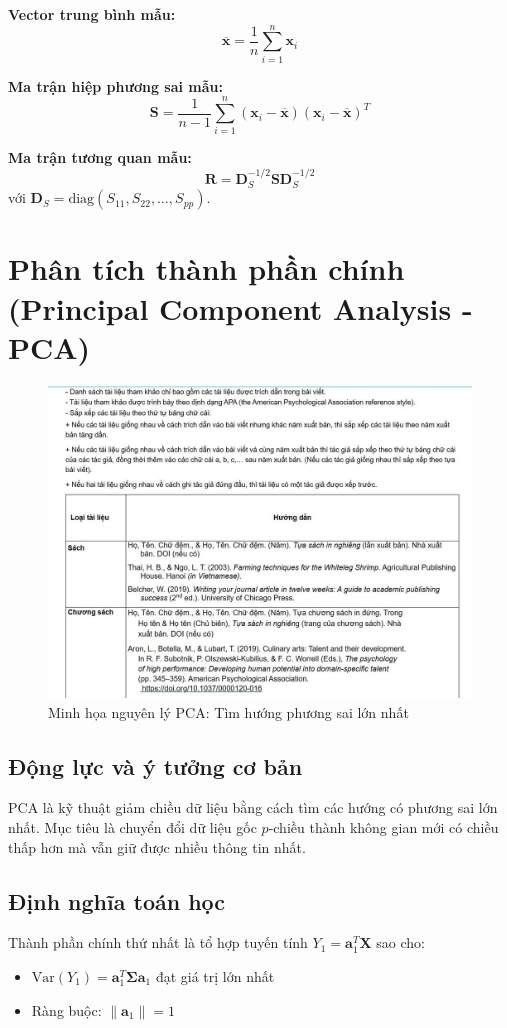 \textbf{Vector trung bình mẫu:}
\[
\overline{\mathbf{x}} = \frac{1}{n}\sum_{i=1}^n \mathbf{x}_i
\]

\textbf{Ma trận hiệp phương sai mẫu:}
\[
\mathbf{S} = \frac{1}{n-1}\sum_{i=1}^n (\mathbf{x}_i - \overline{\mathbf{x}})(\mathbf{x}_i - \overline{\mathbf{x}})^T
\]

\textbf{Ma trận tương quan mẫu:}
\[
\mathbf{R} = \mathbf{D}_S^{-1/2} \mathbf{S} \mathbf{D}_S^{-1/2}
\]
với $\mathbf{D}_S = \text{diag}(S_{11}, S_{22}, \ldots, S_{pp})$.

\section{Phân tích thành phần chính (Principal Component Analysis - PCA)}

\begin{figure}[h!]
    \centering
    \includegraphics[width=0.7\linewidth]{../../assets/images/H1.png}
    \caption{Minh họa nguyên lý PCA: Tìm hướng phương sai lớn nhất}
    \label{fig:pca_principle}
\end{figure}

\subsection{Động lực và ý tưởng cơ bản}
PCA là kỹ thuật giảm chiều dữ liệu bằng cách tìm các hướng có phương sai lớn nhất. Mục tiêu là chuyển đổi dữ liệu gốc $p$-chiều thành không gian mới có chiều thấp hơn mà vẫn giữ được nhiều thông tin nhất.

\subsection{Định nghĩa toán học}
\begin{dn}
Thành phần chính thứ nhất là tổ hợp tuyến tính $Y_1 = \mathbf{a}_1^T\mathbf{X}$ sao cho:
\begin{itemize}
    \item $\text{Var}(Y_1) = \mathbf{a}_1^T\boldsymbol{\Sigma}\mathbf{a}_1$ đạt giá trị lớn nhất
    \item Ràng buộc: $\|\mathbf{a}_1\| = 1$
\end{itemize}
\end{dn}

